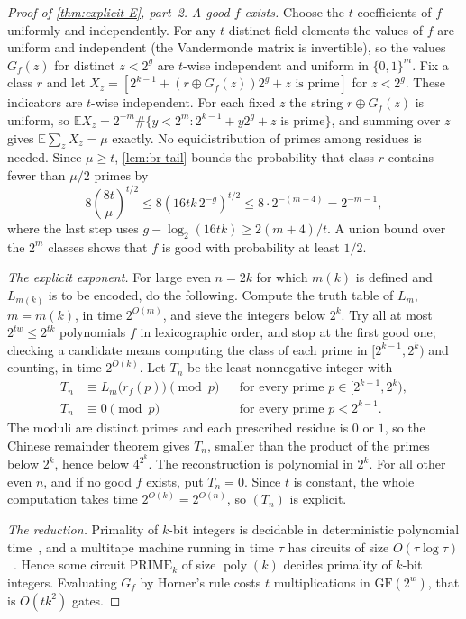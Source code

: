 \documentclass[11pt]{article}
\theoremstyle{definition}
\theoremstyle{remark}
\newcommand{\bits}{\{0,1\}}
\newcommand{\poly}{\operatorname{poly}}
\numberwithin{equation}{section}
\begin{document}
\begin{proof}[Proof of \cref{thm:explicit-E}, part~2]
\emph{A good $f$ exists.}  Choose the $t$ coefficients of $f$ uniformly
and independently.  For any $t$ distinct field elements the values of
$f$ are uniform and independent (the Vandermonde matrix is invertible),
so the values $G_f(z)$ for distinct $z<2^g$ are $t$-wise independent
and uniform in $\bits^m$.  Fix a class $r$ and let
$X_z=[2^{k-1}+(r\oplus G_f(z))2^g+z\text{ is prime}]$ for $z<2^g$.
These indicators are $t$-wise independent.  For each fixed $z$ the
string $r\oplus G_f(z)$ is uniform, so
$\mathbb{E}X_z=2^{-m}\#\{y<2^m:2^{k-1}+y2^g+z\text{ is prime}\}$, and
summing over $z$ gives $\mathbb{E}\sum_zX_z=\mu$ exactly.  No
equidistribution of primes among residues is needed.  Since
$\mu\geq t$, \cref{lem:br-tail} bounds the probability that class $r$
contains fewer than $\mu/2$ primes by
\[
  8\left(\frac{8t}{\mu}\right)^{t/2}
  \leq8\left(16tk\,2^{-g}\right)^{t/2}
  \leq 8\cdot2^{-(m+4)}=2^{-m-1},
\]
where the last step uses
$g-\log_2(16tk)\geq2(m+4)/t$.  A union bound over the $2^m$ classes
shows that $f$ is good with probability at least $1/2$.

\emph{The explicit exponent.}  For large even $n=2k$ for which $m(k)$ is
defined and $L_{m(k)}$ is to be encoded, do the following.  Compute the
truth table of $L_m$, $m=m(k)$, in time $2^{O(m)}$, and sieve the
integers below $2^k$.  Try all at most $2^{tw}\leq2^{tk}$ polynomials $f$
in lexicographic order, and stop at the first good one; checking a
candidate means computing the class of each prime in $[2^{k-1},2^k)$ and
counting, in time $2^{O(k)}$.  Let $T_n$ be the least nonnegative integer
with
\begin{align*}
  T_n&\equiv L_m\bigl(r_f(p)\bigr)\pmod p
  &&\text{for every prime }p\in[2^{k-1},2^k),\\
  T_n&\equiv0\pmod p&&\text{for every prime }p<2^{k-1}.
\end{align*}
The moduli are distinct primes and each prescribed residue is $0$ or
$1$, so the Chinese remainder theorem gives $T_n$, smaller than the
product of the primes below $2^k$, hence below $4^{2^k}$.  The
reconstruction is polynomial in $2^k$.  For all other even $n$, and if
no good $f$ exists, put $T_n=0$.  Since $t$ is constant, the whole
computation takes time $2^{O(k)}=2^{O(n)}$, so $(T_n)$ is explicit.

\emph{The reduction.}  Primality of $k$-bit integers is decidable in
deterministic polynomial time~\cite{AKS04}, and a multitape machine
running in time $\tau$ has circuits of size
$O(\tau\log\tau)$~\cite{PF79}.  Hence some circuit $\mathrm{PRIME}_k$
of size $\poly(k)$ decides primality of $k$-bit integers.  Evaluating
$G_f$ by Horner's rule costs $t$ multiplications in $\mathrm{GF}(2^w)$,
that is $O(tk^2)$ gates.


\end{proof}
\end{document}
